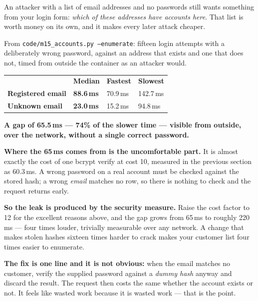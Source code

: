 An attacker with a list of email addresses and no passwords still wants
something from your login form: \emph{which of these addresses have accounts
here}. That list is worth money on its own, and it makes every later attack
cheaper.

\begin{measured}
From \texttt{code/m15\_accounts.py --enumerate}: fifteen login attempts with a
deliberately wrong password, against an address that exists and one that does
not, timed from outside the container as an attacker would.

\smallskip
\begin{tabular}{@{}L{4.6cm}L{3.0cm}L{2.6cm}L{3.0cm}@{}}
& \textbf{Median} & \textbf{Fastest} & \textbf{Slowest} \\
\textbf{Registered email} & \textbf{88.6\,ms} & 70.9\,ms & 142.7\,ms \\
\textbf{Unknown email} & \textbf{23.0\,ms} & 15.2\,ms & 94.8\,ms \\
\end{tabular}

\smallskip
\textbf{A gap of 65.5\,ms --- 74\% of the slower time --- visible from
outside, over the network, without a single correct password.}

\smallskip
\textbf{Where the 65\,ms comes from is the uncomfortable part.} It is almost
exactly the cost of one bcrypt verify at cost 10, measured in the previous
section as 60.3\,ms. A wrong password on a real account must be checked against
the stored hash; a wrong \emph{email} matches no row, so there is nothing to
check and the request returns early.

\smallskip
\textbf{So the leak is produced by the security measure.} Raise the cost factor
to 12 for the excellent reasons above, and the gap grows from 65\,ms to roughly
220\,ms --- four times louder, trivially measurable over any network. A change
that makes stolen hashes sixteen times harder to crack makes your customer list
four times easier to enumerate.

\smallskip
\textbf{The fix is one line and it is not obvious:} when the email matches no
customer, verify the supplied password against a \emph{dummy hash} anyway and
discard the result. The request then costs the same whether the account exists
or not. It feels like wasted work because it is wasted work --- that is the
point.
\end{measured}

